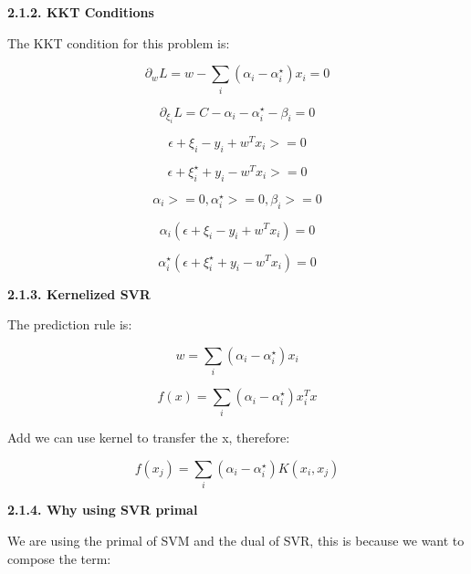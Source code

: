 \documentclass{article} %
\begin{document}
\textbf{2.1.2. KKT Conditions}

The KKT condition for this problem is:

\begin{equation}
\partial_w L = w - \sum_i (\alpha_i - \alpha_i^{\star}) x_i = 0
\end{equation}

\begin{equation}
\partial_{\xi_i} L = C - \alpha_i -\alpha_i^{\star} - \beta_i = 0
\end{equation}

\begin{equation}
\epsilon + \xi_i - y_i + w^T x_i >= 0
\end{equation}

\begin{equation}
\epsilon + \xi_i^{\star} + y_i - w^T x_i >= 0
\end{equation}

\begin{equation}
\alpha_i >= 0, \alpha_i^{\star} >= 0, \beta_i >=0
\end{equation}

\begin{equation}
\alpha_i (\epsilon + \xi_i - y_i + w^T x_i) = 0
\end{equation}

\begin{equation}
\alpha_i^{\star} (\epsilon + \xi_i^{\star} + y_i - w^T x_i) = 0
\end{equation}

\textbf{2.1.3. Kernelized SVR}

The prediction rule is:

\begin{equation}
w = \sum_i (\alpha_i - \alpha_i^{\star}) x_i
\end{equation}

\begin{equation}
f(x) = \sum_i (\alpha_i - \alpha_i^{\star}) x_i^T x
\end{equation}

Add we can use kernel to transfer the x, therefore:

\begin{equation}
f(x_j) = \sum_i (\alpha_i - \alpha_i^{\star}) K(x_i, x_j)
\end{equation}

\textbf{2.1.4. Why using SVR primal}


We are using the primal of SVM and the dual of SVR, this is because we want to
compose the term:
\end{document}
